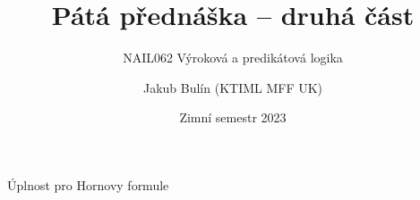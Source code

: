 \documentclass{beamer}
\title{Pátá přednáška -- druhá část}
\subtitle{NAIL062 Výroková a predikátová logika}
\author{Jakub Bulín (KTIML MFF UK)}
\date{Zimní semestr 2023}
\begin{document}
\begin{frame}{Úplnost pro Hornovy formule}
    
\end{frame}
\end{document}
